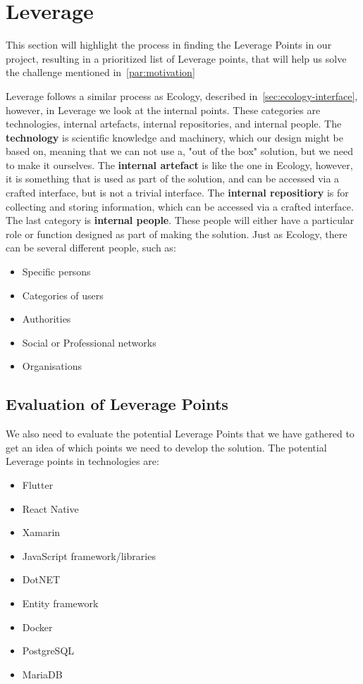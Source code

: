\section{Leverage}\label{sec:leverage}
This section will highlight the process in finding the Leverage Points in our project, resulting in a prioritized list of Leverage points, that will help us solve the challenge mentioned in~\autoref{par:motivation}

Leverage follows a similar process as Ecology, described in~\autoref{sec:ecology-interface}, however, in Leverage we look at the internal points.
These categories are technologies, internal artefacts, internal repositories, and internal people.
The \textbf{technology} is scientific knowledge and machinery, which our design might be based on, meaning that we can not use a, "out of the box" solution, but we need to make it ourselves.
The \textbf{internal artefact} is like the one in Ecology, however, it is something that is used as part of the solution, and can be accessed via a crafted interface, but is not a trivial interface.
The \textbf{internal repositiory} is for collecting and storing information, which can be accessed via a crafted interface.
The last category is \textbf{internal people}.
These people will either have a particular role or function designed as part of making the solution.
Just as Ecology, there can be several different people, such as:

\begin{itemize}
    \item Specific persons
    \item Categories of users
    \item Authorities
    \item Social or Professional networks
    \item Organisations
\end{itemize}

\subsection{Evaluation of Leverage Points}
We also need to evaluate the potential Leverage Points that we have gathered to get an idea of which points we need to develop the solution.
The potential Leverage points in technologies are:

\begin{itemize}
    \item Flutter
    \item React Native
    \item Xamarin
    \item JavaScript framework/libraries
    \item DotNET
    \item Entity framework
    \item Docker
    \item PostgreSQL
    \item MariaDB
\end{itemize}

